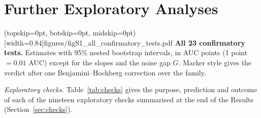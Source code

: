 \documentclass{ieeeaccess}
\begin{document}
\section{Further Exploratory Analyses}
\label{app:exploratory}
\label{sec:exploratory}

\Figure[t!](topskip=0pt, botskip=0pt, midskip=0pt)[width=0.84\columnwidth]{figures/figS1_all_confirmatory_tests.pdf}
{\textbf{All 23 confirmatory tests.} Estimates with 95\% nested bootstrap intervals, in AUC points (1 point $=0.01$ AUC) except for the slopes and the noise gap $G$. Marker style gives the verdict after one Benjamini--Hochberg correction over the family.\label{fig:forest}}

\emph{Exploratory checks.} Table~\ref{tab:checks} gives the purpose, prediction and outcome of each of the nineteen exploratory checks summarised at the end of the Results (Section~\ref{sec:checks}).
\end{document}
